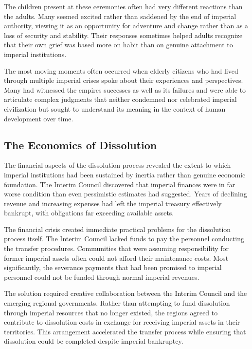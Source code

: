 The children present at these ceremonies often had very different
reactions than the adults. Many seemed excited rather than saddened by
the end of imperial authority, viewing it as an opportunity for
adventure and change rather than as a loss of security and stability.
Their responses sometimes helped adults recognize that their own grief
was based more on habit than on genuine attachment to imperial
institutions.

The most moving moments often occurred when elderly citizens who had
lived through multiple imperial crises spoke about their experiences and
perspectives. Many had witnessed the empire\textquotesingle s successes
as well as its failures and were able to articulate complex judgments
that neither condemned nor celebrated imperial civilization but sought
to understand its meaning in the context of human development over time.

\subsection{The Economics of
Dissolution}\label{the-economics-of-dissolution}

The financial aspects of the dissolution process revealed the extent to
which imperial institutions had been sustained by inertia rather than
genuine economic foundation. The Interim Council discovered that
imperial finances were in far worse condition than even pessimistic
estimates had suggested. Years of declining revenue and increasing
expenses had left the imperial treasury effectively bankrupt, with
obligations far exceeding available assets.

The financial crisis created immediate practical problems for the
dissolution process itself. The Interim Council lacked funds to pay the
personnel conducting the transfer procedures. Communities that were
assuming responsibility for former imperial assets often could not
afford their maintenance costs. Most significantly, the severance
payments that had been promised to imperial personnel could not be
funded through normal imperial revenues.

The solution required creative collaboration between the Interim Council
and the emerging regional governments. Rather than attempting to fund
dissolution through imperial resources that no longer existed, the
regions agreed to contribute to dissolution costs in exchange for
receiving imperial assets in their territories. This arrangement
accelerated the transfer process while ensuring that dissolution could
be completed despite imperial bankruptcy.

